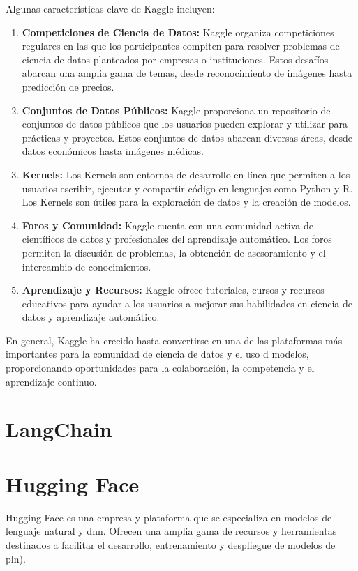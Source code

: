 Algunas características clave de Kaggle incluyen:
\begin{enumerate}
\item \textbf{Competiciones de Ciencia de Datos:} Kaggle organiza competiciones regulares en las que los participantes compiten para resolver problemas de ciencia de datos planteados por empresas o instituciones. Estos desafíos abarcan una amplia gama de temas, desde reconocimiento de imágenes hasta predicción de precios.

\item \textbf{Conjuntos de Datos Públicos:} Kaggle proporciona un repositorio de conjuntos de datos públicos que los usuarios pueden explorar y utilizar para prácticas y proyectos. Estos conjuntos de datos abarcan diversas áreas, desde datos económicos hasta imágenes médicas.

\item \textbf{Kernels:} Los Kernels son entornos de desarrollo en línea que permiten a los usuarios escribir, ejecutar y compartir código en lenguajes como Python y R. Los Kernels son útiles para la exploración de datos y la creación de modelos.

\item \textbf{Foros y Comunidad:} Kaggle cuenta con una comunidad activa de científicos de datos y profesionales del aprendizaje automático. Los foros permiten la discusión de problemas, la obtención de asesoramiento y el intercambio de conocimientos.

\item \textbf{Aprendizaje y Recursos:} Kaggle ofrece tutoriales, cursos y recursos educativos para ayudar a los usuarios a mejorar sus habilidades en ciencia de datos y aprendizaje automático.
\end{enumerate}

En general, Kaggle ha crecido hasta convertirse en una de las plataformas más importantes para la comunidad de ciencia de datos y el uso d modelos, proporcionando oportunidades para la colaboración, la competencia y el aprendizaje continuo.

\section{LangChain}


\section{Hugging Face}

Hugging Face es una empresa y plataforma que se especializa en modelos de lenguaje natural y \acrlong{dnn}. Ofrecen una amplia gama de recursos y herramientas destinados a facilitar el desarrollo, entrenamiento y despliegue de modelos de \acrfull{pln}).

